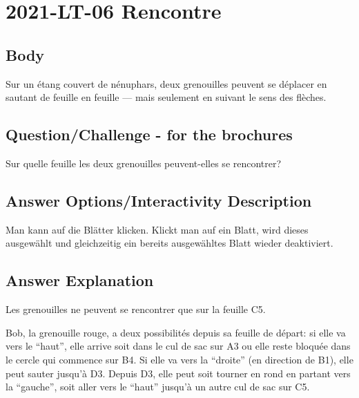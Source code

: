 \documentclass[a4paper,11pt]{report}
\newcommand{\taskGraphicsFolder}{..}
\begin{document}
\section*{\centering{} 2021-LT-06 Rencontre}


\subsection*{Body}

Sur un étang couvert de nénuphars, deux grenouilles peuvent se déplacer en sautant de feuille en feuille — mais seulement en suivant le sens des flèches.

{\em


\subsection*{Question/Challenge - for the brochures}

Sur quelle feuille les deux grenouilles peuvent-elles se rencontrer?

{\centering%
\par}

}

\begingroup
\renewcommand{\arraystretch}{1.5}
\subsection*{Answer Options/Interactivity Description}



Man kann auf die Blätter klicken. Klickt man auf ein Blatt, wird dieses ausgewählt und gleichzeitig ein bereits ausgewähltes Blatt wieder deaktiviert.

\endgroup

\subsection*{Answer Explanation}

Les grenouilles ne peuvent se rencontrer que sur la feuille C5.

{\centering%
\par}

Bob, la grenouille rouge, a deux possibilités depuis sa feuille de départ: si elle va vers le “haut”, elle arrive soit dans le cul de sac sur A3 ou elle reste bloquée dans le cercle qui commence sur B4. Si elle va vers la “droite” (en direction de B1), elle peut sauter jusqu’à D3. Depuis D3, elle peut soit tourner en rond en partant vers la “gauche”, soit aller vers le “haut” jusqu’à un autre cul de sac sur C5.
\end{document}
